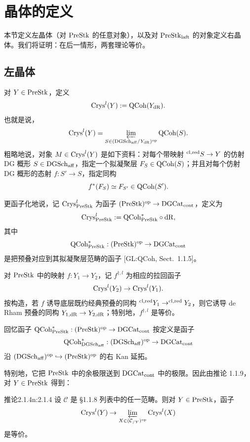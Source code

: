 \chapter{晶体的定义}

本节定义左晶体（对 $\mathrm{PreStk}$ 的任意对象），以及对 $\mathrm{PreStk}_{\mathrm{laft}}$ 的对象定义右晶体。我们将证明：在后一情形，两套理论等价。

\section{左晶体}

对 $Y\in\mathrm{PreStk}$，定义
\[
\mathrm{Crys}^l(Y):=\mathrm{QCoh}(Y_{\mathrm{dR}}).
\]
也就是说，
\[
\mathrm{Crys}^l(Y)=\varprojlim_{S\in(\mathrm{DGSch}_{\mathrm{aff}}/Y_{\mathrm{dR}})^{\mathrm{op}}}\mathrm{QCoh}(S).
\]
粗略地说，对象 $M\in\mathrm{Crys}^l(Y)$ 是如下资料：对每个带映射 $^{\mathrm{cl,red}} S\to Y$ 的仿射 DG 概形 $S\in\mathrm{DGSch}_{\mathrm{aff}}$，指定一个拟凝聚层 $F_S\in\mathrm{QCoh}(S)$；并且对每个仿射 DG 概形的态射 $f:S'\to S$，指定同构
\[
f^*(F_S)\simeq F_{S'}\in\mathrm{QCoh}(S').
\]

更函子化地说，记 $\mathrm{Crys}^l_{\mathrm{PreStk}}$ 为函子 $(\mathrm{PreStk})^{\mathrm{op}}\to\mathrm{DGCat}_{\mathrm{cont}}$，定义为
\[
\mathrm{Crys}^l_{\mathrm{PreStk}}:=\mathrm{QCoh}^*_{\mathrm{PreStk}}\circ\mathrm{dR},
\]
其中
\[
\mathrm{QCoh}^*_{\mathrm{PreStk}}:(\mathrm{PreStk})^{\mathrm{op}}\to\mathrm{DGCat}_{\mathrm{cont}}
\]
是把预叠对应到其拟凝聚层范畴的函子 [GL:QCoh, Sect.~1.1.5]。

对 $\mathrm{PreStk}$ 中的映射 $f:Y_1\to Y_2$，记 $f^{\dagger,l}$ 为相应的拉回函子
\[
\mathrm{Crys}^l(Y_2)\to\mathrm{Crys}^l(Y_1).
\]
按构造，若 $f$ 诱导底层既约经典预叠的同构 $^{\mathrm{cl,red}} Y_1\to^{\mathrm{cl,red}} Y_2$，则它诱导 de Rham 预叠的同构 $Y_{1,\mathrm{dR}}\to Y_{2,\mathrm{dR}}$；特别地，$f^{\dagger,l}$ 是等价。

回忆函子 $\mathrm{QCoh}^*_{\mathrm{PreStk}}:(\mathrm{PreStk})^{\mathrm{op}}\to\mathrm{DGCat}_{\mathrm{cont}}$ 按定义是函子
\[
\mathrm{QCoh}^*_{\mathrm{DGSch}_{\mathrm{aff}}}:(\mathrm{DGSch}_{\mathrm{aff}})^{\mathrm{op}}\to\mathrm{DGCat}_{\mathrm{cont}}
\]
沿 $(\mathrm{DGSch}_{\mathrm{aff}})^{\mathrm{op}}\hookrightarrow(\mathrm{PreStk})^{\mathrm{op}}$ 的右 Kan 延拓。

特别地，它把 $\mathrm{PreStk}$ 中的余极限送到 $\mathrm{DGCat}_{\mathrm{cont}}$ 中的极限。因此由推论 1.1.9，对 $Y\in\mathrm{PreStk}$ 得到：

\begin{othm}{推论}{2.1.4}{n:2.1.4}
设 $\mathcal{C}$ 是 §1.1.8 列表中的任一范畴。则对 $Y\in\mathrm{PreStk}$，函子
\[
\mathrm{Crys}^l(Y)\to\varprojlim_{X\in(\mathcal{C}_{/Y})^{\mathrm{op}}}\mathrm{Crys}^l(X)
\]
是等价。
\end{othm}

